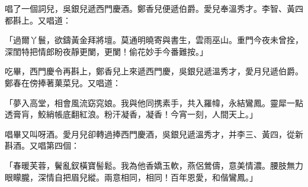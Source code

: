 \begin{showcontents}{}
唱了一個詞兒，吳銀兒遞西門慶酒。鄭香兒便遞伯爵。愛兒奉溫秀才。李智、黃四都斟上。又唱道：

「過爾丫鬟，欲鑄黃金拜將壇。莫通明曉寄與書生，雲雨巫山。重門今夜未曾拴，深閨特把情郎盼夜靜更闌，更闌！偷花妙手今番難按。」

吃畢，西門慶令再斟上，鄭香兒上來遞西門慶，吳銀兒遞溫秀才，愛月兒遞伯爵。鄭春在傍捧著菓菜兒。又唱道：

「夢入高堂，相會風流窈窕娘。我與他同携素手，共入羅幃，永結鸞鳳。靈犀一點透膏肓，鮫綃帳底翻紅浪。粉汗凝香，凝香！今宵一刻，人間天上。」

唱畢又叫呀酒。愛月兒卻轉過捧西門慶酒，吳銀兒遞溫秀才，并李三、黃四，從新斟酒。又唱第四個：

「春暖芙蓉，鬢亂釵橫寶髻鬆。我為他香嬌玉軟，燕侶鶯儔，意美情濃。腰肢無力眼矇朧，深情自把眉兒縱。兩意相同，相同！百年恩愛，和偕鸞鳳。」


\end{showcontents}
